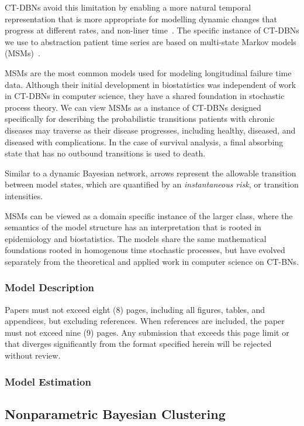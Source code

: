 CT-DBNs avoid this limitation by enabling a more natural temporal representation that is more appropriate for modelling dynamic changes that progress at different rates, and non-liner time~\cite{Nodelman02}. The specific instance of CT-DBNs we use to abstraction patient time series are based on multi-state Markov models (MSMs)~\cite{Jackson10}.

MSMs are the most common models used for modeling longitudinal failure time data.  Although their initial development in biostatistics was independent of work in CT-DBNs in computer science, they have a shared foundation in stochastic process theory.  We can view MSMs as a instance of CT-DBNs designed specifically for describing the probabilistic transitions patients with chronic diseases may traverse as their disease progresses, including healthy, diseased, and diseased with complications.  In the case of survival analysis, a final absorbing state that has no outbound transitions is used to death.

Similar to a dynamic Bayesian network, arrows represent the allowable transition between model states, which are quantified by an \emph{instantaneous risk}, or transition intensities.

MSMs can be viewed as a domain specific instance of the larger class, where the semantics of the model structure has an interpretation that is rooted in epidemiology and biostatistics.  The models share the same mathematical foundations rooted in homogenous time stochastic processes, but have evolved separately from the theoretical and applied work in computer science on CT-BNs.

\subsubsection{Model Description}

Papers must not exceed eight (8) pages, including all figures, tables,
and appendices, but excluding references. When references are included,
the paper must not exceed nine (9) pages. Any submission that exceeds
this page limit or that diverges significantly from the format specified
herein will be rejected without review.


\subsubsection{Model Estimation}


\subsection{Nonparametric Bayesian Clustering}

